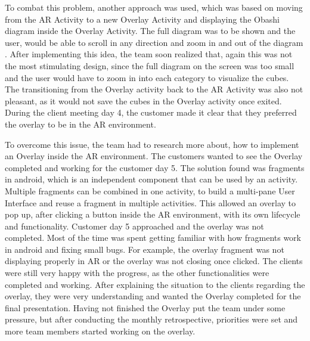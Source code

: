 \documentclass{l3proj}
\begin{document}
To combat this problem, another approach was used, which was based on moving from the
AR Activity to a new Overlay Activity\cite{MovingActivities} and displaying the Obashi 
diagram inside the Overlay Activity. The full diagram was to be shown and the user, would 
be able to scroll in any direction and zoom in and out of the diagram \cite{Zooming}. After 
implementing this idea, the team soon realized that, again this was not the most stimulating 
design, since the full diagram on the screen was too small and the user would have to zoom 
in into each category to visualize the cubes. The transitioning from the Overlay activity 
back to the AR Activity was also not pleasant, as it would not save the cubes in the Overlay 
activity once exited. During the client meeting day 4, the customer made it clear that they 
preferred the overlay to be in the AR environment.

To overcome this issue, the team had to research more about, how to implement an Overlay
inside the AR environment. The customers wanted to see the Overlay completed and working for 
the customer day 5. The solution found was fragments in android, which is an independent 
component that can be used by an activity. Multiple fragments can be combined in one activity, 
to build a multi-pane User Interface and reuse a fragment in multiple activities\cite{Fragments}. 
This allowed an overlay to pop up, after clicking a button inside the AR environment, with its 
own lifecycle and functionality. Customer day 5 approached and the overlay was not completed. 
Most of the time was spent getting familiar with how fragments work in android and fixing small 
bugs. For example, the overlay fragment was not displaying properly in AR or the overlay was 
not closing once clicked. The clients were still very happy with the progress, as the other 
functionalities were completed and working. After explaining the situation to the clients 
regarding the overlay, they were very understanding and wanted the Overlay completed for the 
final presentation. Having not finished the Overlay put the team under some pressure, but 
after conducting the monthly retrospective, priorities were set and more team members started 
working on the overlay. 
\end{document}
